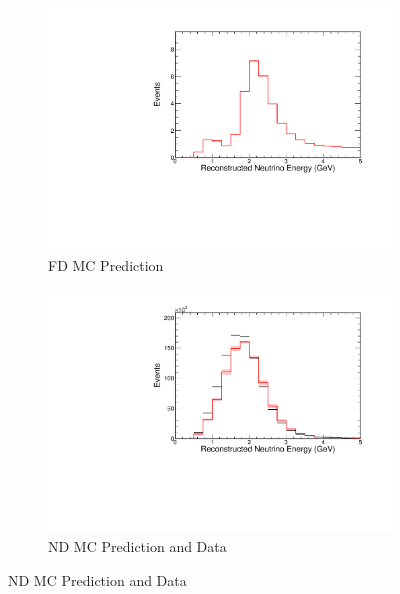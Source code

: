 {\begin{figure}
\end{figure}



\begin{figure}
\begin{center}
\begin{subfigure}[c]{0.49\textwidth}
\includegraphics[width=\textwidth]{figures/systs/prediction/fd_mc_prediction_trkLenND.pdf}
\caption*{FD MC Prediction}
\end{subfigure}
\begin{subfigure}[c]{0.49\textwidth}
\includegraphics[width=\textwidth]{figures/systs/prediction/nd_mc_prediction_trkLenND.pdf}
\caption*{ND MC Prediction and Data}
\end{subfigure}

\vspace{20pt}


\end{center}
\end{figure}}
